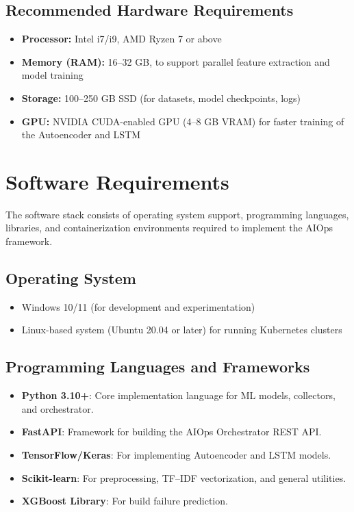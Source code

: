 \documentclass[12pt]{report}
\begin{document}
\subsection*{Recommended Hardware Requirements}
\begin{itemize}
    \item \textbf{Processor:} Intel i7/i9, AMD Ryzen 7 or above
    \item \textbf{Memory (RAM):} 16--32 GB, to support parallel feature extraction and model training
    \item \textbf{Storage:} 100--250 GB SSD (for datasets, model checkpoints, logs)
    \item \textbf{GPU:} NVIDIA CUDA-enabled GPU (4--8 GB VRAM) for faster training of the Autoencoder and LSTM
\end{itemize}


\section{Software Requirements}

The software stack consists of operating system support, programming languages, libraries, and containerization environments required to implement the AIOps framework.

\subsection*{Operating System}
\begin{itemize}
    \item Windows 10/11 (for development and experimentation)
    \item Linux-based system (Ubuntu 20.04 or later) for running Kubernetes clusters
\end{itemize}

\subsection*{Programming Languages and Frameworks}
\begin{itemize}
    \item \textbf{Python 3.10+}: Core implementation language for ML models, collectors, and orchestrator.
    \item \textbf{FastAPI}: Framework for building the AIOps Orchestrator REST API.
    \item \textbf{TensorFlow/Keras}: For implementing Autoencoder and LSTM models.
    \item \textbf{Scikit-learn}: For preprocessing, TF–IDF vectorization, and general utilities.
    \item \textbf{XGBoost Library}: For build failure prediction.
\end{itemize}
\end{document}
